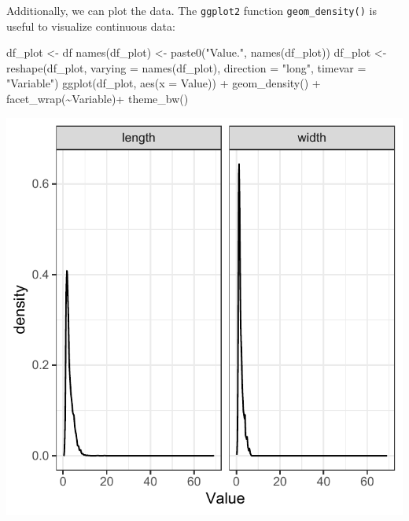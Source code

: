 \documentclass[
  man,floatsintext]{apa6}
\newenvironment{Shaded}{\begin{snugshade}}{\end{snugshade}}
\newcommand{\AttributeTok}[1]{\textcolor[rgb]{0.77,0.63,0.00}{#1}}
\newcommand{\FunctionTok}[1]{\textcolor[rgb]{0.00,0.00,0.00}{#1}}
\newcommand{\NormalTok}[1]{#1}
\newcommand{\OtherTok}[1]{\textcolor[rgb]{0.56,0.35,0.01}{#1}}
\newcommand{\SpecialCharTok}[1]{\textcolor[rgb]{0.00,0.00,0.00}{#1}}
\newcommand{\StringTok}[1]{\textcolor[rgb]{0.31,0.60,0.02}{#1}}
\begin{document}
Additionally, we can plot the data.
The \texttt{ggplot2} function \texttt{geom\_density()} is useful to visualize continuous data:

\begin{Shaded}
\begin{Highlighting}[]
\NormalTok{df\_plot }\OtherTok{\textless{}{-}}\NormalTok{ df}
\FunctionTok{names}\NormalTok{(df\_plot) }\OtherTok{\textless{}{-}} \FunctionTok{paste0}\NormalTok{(}\StringTok{"Value."}\NormalTok{, }\FunctionTok{names}\NormalTok{(df\_plot))}
\NormalTok{df\_plot }\OtherTok{\textless{}{-}} \FunctionTok{reshape}\NormalTok{(df\_plot, }\AttributeTok{varying =} \FunctionTok{names}\NormalTok{(df\_plot), }\AttributeTok{direction =} \StringTok{"long"}\NormalTok{,}
                   \AttributeTok{timevar =} \StringTok{"Variable"}\NormalTok{)}
\FunctionTok{ggplot}\NormalTok{(df\_plot, }\FunctionTok{aes}\NormalTok{(}\AttributeTok{x =}\NormalTok{ Value)) }\SpecialCharTok{+}
  \FunctionTok{geom\_density}\NormalTok{() }\SpecialCharTok{+}
  \FunctionTok{facet\_wrap}\NormalTok{(}\SpecialCharTok{\textasciitilde{}}\NormalTok{Variable)}\SpecialCharTok{+}
  \FunctionTok{theme\_bw}\NormalTok{()}
\end{Highlighting}
\end{Shaded}

\includegraphics{appendices/plot_gmm_desc.pdf}
\end{document}
